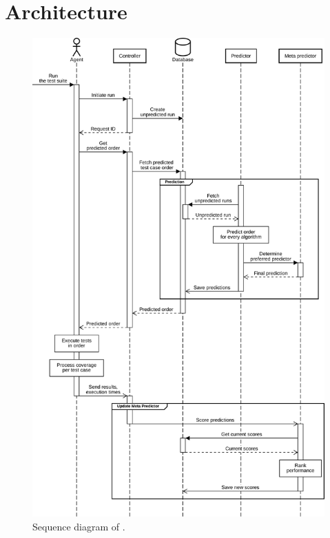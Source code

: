 
\section{Architecture}

\begin{figure}[htbp!]
	\centering
	\includegraphics[height=\textheight]{assets/diagrams/sequence-diagram.pdf}
	\caption{Sequence diagram of \velocity{}.}
	\label{fig:velocity-sequence-diagram}
\end{figure}

